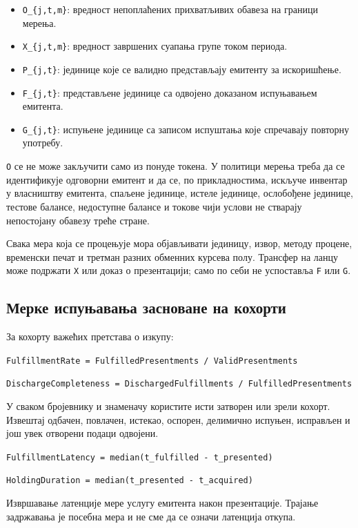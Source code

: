 \documentclass[11pt]{article}
\begin{document}
\begin{itemize}[leftmargin=*]
\item \texttt{O\_\{j,t,m\}}: вредност непоплаћених прихватљивих обавеза на граници мерења.
\item \texttt{X\_\{j,t,m\}}: вредност завршених суапања групе током периода.
\item \texttt{P\_\{j,t\}}: јединице које се валидно представљају емитенту за искоришћење.
\item \texttt{F\_\{j,t\}}: представљене јединице са одвојено доказаном испуњавањем емитента.
\item \texttt{G\_\{j,t\}}: испуњене јединице са записом испуштања које спречавају повторну употребу.
\end{itemize}
\texttt{O} се не може закључити само из понуде токена. У политици мерења треба да се идентификује одговорни емитент и да се, по прикладностима, искључе инвентар у власништву емитента, спаљене јединице, истеле јединице, ослобођене јединице, тестове балансе, недоступне балансе и токове чији услови не стварају непостојану обавезу треће стране.

Свака мера која се процењује мора објављивати јединицу, извор, методу процене, временски печат и третман разних обменних курсева полу. Трансфер на ланцу може подржати \texttt{X} или доказ о презентацији; само по себи не успоставља \texttt{F} или \texttt{G}.

\subsection*{Мерке испуњавања засноване на кохорти}

За кохорту важећих претстава о изкупу:

\texttt{FulfillmentRate = FulfilledPresentments / ValidPresentments}

\texttt{DischargeCompleteness = DischargedFulfillments / FulfilledPresentments}

У сваком бројевнику и знаменачу користите исти затворен или зрели кохорт. Извештај одбачен, повлачен, истекао, оспорен, делимично испуњен, исправљен и још увек отворени подаци одвојени.

\texttt{FulfillmentLatency = median(t\_fulfilled - t\_presented)}

\texttt{HoldingDuration = median(t\_presented - t\_acquired)}

Извршавање латенције мере услугу емитента након презентације. Трајање задржавања је посебна мера и не сме да се означи латенција откупа.
\end{document}
